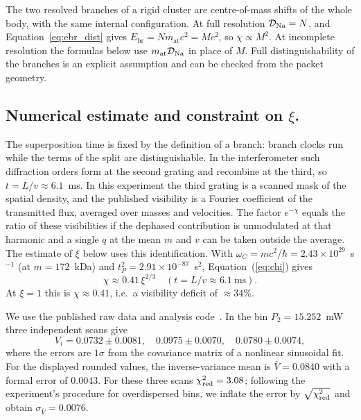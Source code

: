 \documentclass[11pt,a4paper]{article}
\begin{document}
The two resolved branches of a rigid cluster are centre-of-mass shifts of the whole body, with the same internal configuration. At full resolution $\mathcal D_{\rm Na}=N$, and Equation~\eqref{eq:ebr_dist} gives $E_{\mathrm{br}}=Nm_{\mathrm{at}}c^2=Mc^2$, so $\chi\propto M^2$. At incomplete resolution the formulas below use $m_{\mathrm{at}}\mathcal D_{\rm Na}$ in place of $M$. Full distinguishability of the branches is an explicit assumption and can be checked from the packet geometry.

\subsection{Numerical estimate and constraint on \texorpdfstring{$\xi$}{xi}.}
\label{sec:xi_bound}
The superposition time is fixed by the definition of a branch: branch clocks run while the terms of the split are distinguishable. In the interferometer such diffraction orders form at the second grating and recombine at the third, so $t=L/v\approx6.1$~ms. In this experiment the third grating is a scanned mask of the spatial density, and the published visibility is a Fourier coefficient of the transmitted flux, averaged over masses and velocities. The factor $e^{-\chi}$ equals the ratio of these visibilities if the dephased contribution is unmodulated at that harmonic and a single $q$ at the mean $m$ and $v$ can be taken outside the average. The estimate of $\xi$ below uses this identification. With $\omega_C=mc^2/\hbar=2.43\times10^{29}$~s$^{-1}$ (at $m=172$~kDa) and $t_P^2=2.91\times10^{-87}$~s$^2$, Equation~(\ref{eq:chi}) gives
\begin{equation}
\chi\approx 0.41\,\xi^{2/3}\quad (t=L/v\approx 6.1~\text{ms}).
\end{equation}
At $\xi=1$ this is $\chi\approx 0.41$, i.e.\ a visibility deficit of $\approx34\%$.

We use the published raw data and analysis code~\cite{arndt_data}. In the bin $P_2=15.252$~mW three independent scans give
\begin{equation}
V_i=0.0732\pm0.0081,\quad
0.0975\pm0.0070,\quad
0.0780\pm0.0074,
\end{equation}
where the errors are $1\sigma$ from the covariance matrix of a nonlinear sinusoidal fit. For the displayed rounded values, the inverse-variance mean is $\bar V=0.0840$ with a formal error of $0.0043$. For these three scans $\chi^2_{\rm red}=3.08$; following the experiment's procedure for overdispersed bins, we inflate the error by $\sqrt{\chi^2_{\rm red}}$ and obtain $\sigma_{\bar V}=0.0076$.
\end{document}
